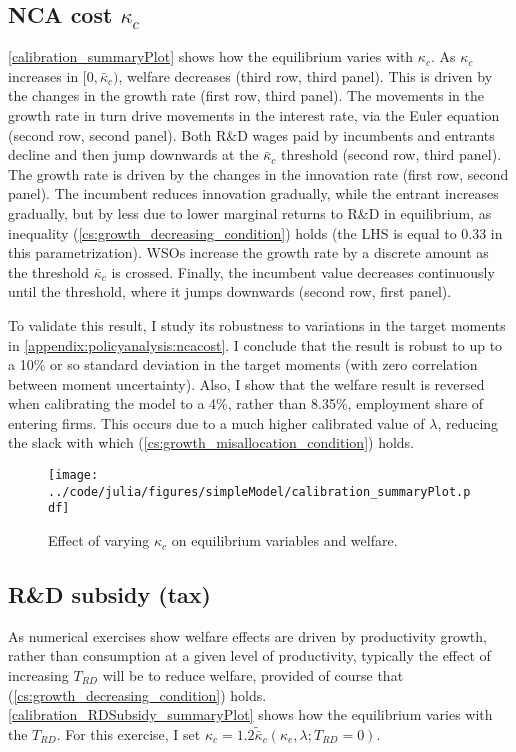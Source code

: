 \documentclass[11pt,english]{article}
\begin{document}
\subsection{NCA cost $\kappa_c$}

\autoref{calibration_summaryPlot} shows how the equilibrium varies with $\kappa_c$. As $\kappa_c$ increases in $[0,\bar{\kappa}_c)$, welfare decreases (third row, third panel). This is driven by the changes in the growth rate (first row, third panel). The movements in the growth rate in turn drive movements in the interest rate, via the Euler equation (second row, second panel). Both R\&D wages paid by incumbents and entrants decline and then jump downwards at the $\bar{\kappa}_c$ threshold (second row, third panel). The growth rate is driven by the changes in the innovation rate (first row, second panel). The incumbent reduces innovation gradually, while the entrant increases gradually, but by less due to lower marginal returns to R\&D in equilibrium, as inequality (\ref{cs:growth_decreasing_condition}) holds (the LHS is equal to 0.33 in this parametrization). WSOs increase the growth rate by a discrete amount as the threshold $\bar{\kappa}_c$ is crossed. Finally, the incumbent value decreases continuously until the threshold, where it jumps downwards (second row, first panel). 

To validate this result, I study its robustness to variations in the target moments in \ref{appendix:policyanalysis:ncacost}. I conclude that the result is robust to up to a 10\% or so standard deviation in the target moments (with zero correlation between moment uncertainty). Also, I show that the welfare result is reversed when calibrating the model to a 4\%, rather than 8.35\%, employment share of entering firms. This occurs due to a much higher calibrated value of $\lambda$, reducing the slack with which (\ref{cs:growth_misallocation_condition}) holds.  

\begin{figure}[]
	\texttt{[image: ../code/julia/figures/simpleModel/calibration\_summaryPlot.pdf]}
	\caption{Effect of varying $\kappa_c$ on equilibrium variables and welfare.}
	\label{calibration_summaryPlot}
\end{figure}

\subsection{R\&D subsidy (tax)}

As numerical exercises show welfare effects are driven by productivity growth, rather than consumption at a given level of productivity, typically the effect of increasing $T_{RD}$ will be to reduce welfare, provided of course that (\ref{cs:growth_decreasing_condition}) holds. \autoref{calibration_RDSubsidy_summaryPlot} shows how the equilibrium varies with the $T_{RD}$. For this exercise, I set $\kappa_c = 1.2 \tilde{\bar{\kappa}}_c(\kappa_e,\lambda;T_{RD} = 0)$. 
\end{document}
